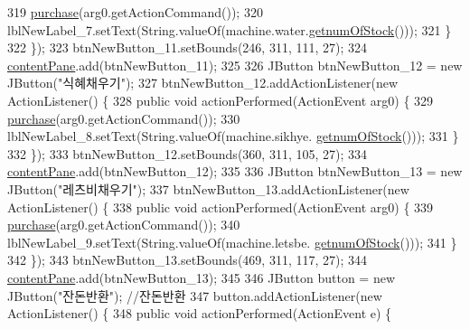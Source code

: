\begin{DoxyCode}
319                 \hyperlink{class_vending_machine_1_1_machine_u_i_aadccf593dc69281c9ebbfe1fbe09b804}{purchase}(arg0.getActionCommand());
320                 lblNewLabel\_7.setText(String.valueOf(machine.water.\hyperlink{class_vending_machine_1_1_product_a199bec8565bf69e9231248a49076a01b}{getnumOfStock}()));
321             \}
322         \});
323         btnNewButton\_11.setBounds(246, 311, 111, 27);
324         \hyperlink{class_vending_machine_1_1_machine_u_i_ac8ef25585e46da798d067af0eefa1a03}{contentPane}.add(btnNewButton\_11);
325         
326         JButton btnNewButton\_12 = \textcolor{keyword}{new} JButton(\textcolor{stringliteral}{"식혜채우기"});
327         btnNewButton\_12.addActionListener(\textcolor{keyword}{new} ActionListener() \{
328             \textcolor{keyword}{public} \textcolor{keywordtype}{void} actionPerformed(ActionEvent arg0) \{
329                 \hyperlink{class_vending_machine_1_1_machine_u_i_aadccf593dc69281c9ebbfe1fbe09b804}{purchase}(arg0.getActionCommand());
330                 lblNewLabel\_8.setText(String.valueOf(machine.sikhye.
      \hyperlink{class_vending_machine_1_1_product_a199bec8565bf69e9231248a49076a01b}{getnumOfStock}()));
331             \}
332         \});
333         btnNewButton\_12.setBounds(360, 311, 105, 27);
334         \hyperlink{class_vending_machine_1_1_machine_u_i_ac8ef25585e46da798d067af0eefa1a03}{contentPane}.add(btnNewButton\_12);
335         
336         JButton btnNewButton\_13 = \textcolor{keyword}{new} JButton(\textcolor{stringliteral}{"레츠비채우기"});
337         btnNewButton\_13.addActionListener(\textcolor{keyword}{new} ActionListener() \{
338             \textcolor{keyword}{public} \textcolor{keywordtype}{void} actionPerformed(ActionEvent arg0) \{
339                 \hyperlink{class_vending_machine_1_1_machine_u_i_aadccf593dc69281c9ebbfe1fbe09b804}{purchase}(arg0.getActionCommand());
340                 lblNewLabel\_9.setText(String.valueOf(machine.letsbe.
      \hyperlink{class_vending_machine_1_1_product_a199bec8565bf69e9231248a49076a01b}{getnumOfStock}()));
341             \}
342         \});
343         btnNewButton\_13.setBounds(469, 311, 117, 27);
344         \hyperlink{class_vending_machine_1_1_machine_u_i_ac8ef25585e46da798d067af0eefa1a03}{contentPane}.add(btnNewButton\_13);
345         
346         JButton button = \textcolor{keyword}{new} JButton(\textcolor{stringliteral}{"잔돈반환"}); \textcolor{comment}{//잔돈반환}
347         button.addActionListener(\textcolor{keyword}{new} ActionListener() \{
348             \textcolor{keyword}{public} \textcolor{keywordtype}{void} actionPerformed(ActionEvent e) \{

\end{DoxyCode}
